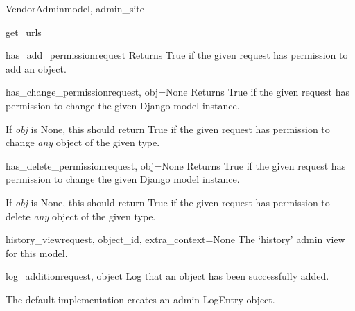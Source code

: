 \documentclass[letterpaper,10pt,english]{sphinxmanual}
\begin{document}
\begin{classdesc}{VendorAdmin}{model, admin\_site}
\hypertarget{data.admin.VendorAdmin.get_urls}{}\begin{methoddesc}{get\_urls}{}\end{methoddesc}

\hypertarget{data.admin.VendorAdmin.has_add_permission}{}\begin{methoddesc}{has\_add\_permission}{request}
Returns True if the given request has permission to add an object.
\end{methoddesc}

\hypertarget{data.admin.VendorAdmin.has_change_permission}{}\begin{methoddesc}{has\_change\_permission}{request, obj=None}
Returns True if the given request has permission to change the given
Django model instance.

If \emph{obj} is None, this should return True if the given request has
permission to change \emph{any} object of the given type.
\end{methoddesc}

\hypertarget{data.admin.VendorAdmin.has_delete_permission}{}\begin{methoddesc}{has\_delete\_permission}{request, obj=None}
Returns True if the given request has permission to change the given
Django model instance.

If \emph{obj} is None, this should return True if the given request has
permission to delete \emph{any} object of the given type.
\end{methoddesc}

\hypertarget{data.admin.VendorAdmin.history_view}{}\begin{methoddesc}{history\_view}{request, object\_id, extra\_context=None}
The `history' admin view for this model.
\end{methoddesc}

\hypertarget{data.admin.VendorAdmin.log_addition}{}\begin{methoddesc}{log\_addition}{request, object}
Log that an object has been successfully added.

The default implementation creates an admin LogEntry object.
\end{methoddesc}


\end{classdesc}
\end{document}
